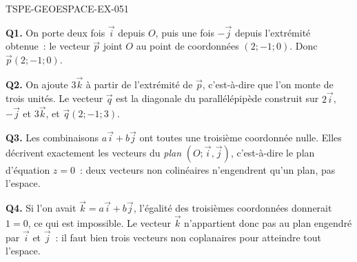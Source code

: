 \begin{corrige}{TSPE-GEOESPACE-EX-051}

\textbf{Q1.} On porte deux fois $\vec{i}$ depuis $O$, puis une fois $-\vec{j}$
depuis l'extrémité obtenue~: le vecteur $\vec{p}$ joint $O$ au point de
coordonnées $(2;-1;0)$. Donc $\vec{p}(2;-1;0)$.

\textbf{Q2.} On ajoute $3\vec{k}$ à partir de l'extrémité de $\vec{p}$, c'est-à-dire
que l'on monte de trois unités. Le vecteur $\vec{q}$ est la diagonale du
parallélépipède construit sur $2\vec{i}$, $-\vec{j}$ et $3\vec{k}$, et
$\vec{q}(2;-1;3)$.

\textbf{Q3.} Les combinaisons $a\vec{i}+b\vec{j}$ ont toutes une troisième
coordonnée nulle. Elles décrivent exactement les vecteurs du \emph{plan}
$(O;\vec{i},\vec{j})$, c'est-à-dire le plan d'équation $z=0$~: deux vecteurs
non colinéaires n'engendrent qu'un plan, pas l'espace.

\textbf{Q4.} Si l'on avait $\vec{k}=a\vec{i}+b\vec{j}$, l'égalité des
troisièmes coordonnées donnerait $1=0$, ce qui est impossible. Le vecteur
$\vec{k}$ n'appartient donc pas au plan engendré par $\vec{i}$ et $\vec{j}$~:
il faut bien trois vecteurs non coplanaires pour atteindre tout l'espace.

\end{corrige}

%
%
